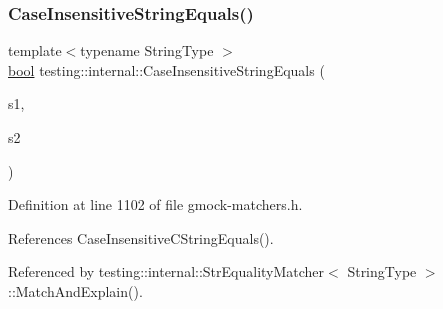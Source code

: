 \subsubsection{\texorpdfstring{Case\+Insensitive\+String\+Equals()}{CaseInsensitiveStringEquals()}}
{\footnotesize\ttfamily template$<$typename String\+Type $>$ \\
\hyperlink{classbool}{bool} testing\+::internal\+::\+Case\+Insensitive\+String\+Equals (\begin{DoxyParamCaption}\item[{const String\+Type \&}]{s1,  }\item[{const String\+Type \&}]{s2 }\end{DoxyParamCaption})}



Definition at line 1102 of file gmock-\/matchers.\+h.



References Case\+Insensitive\+C\+String\+Equals().



Referenced by testing\+::internal\+::\+Str\+Equality\+Matcher$<$ String\+Type $>$\+::\+Match\+And\+Explain().


